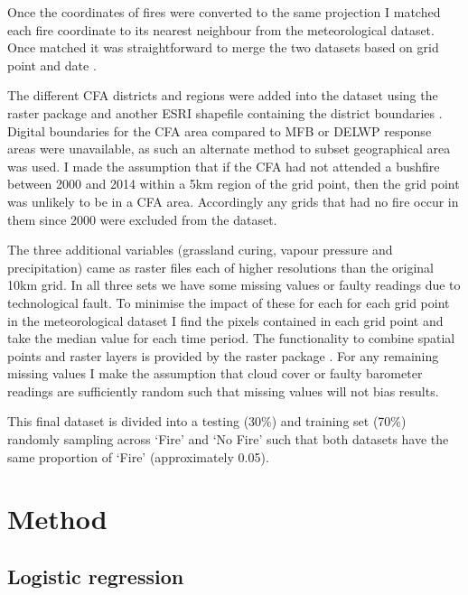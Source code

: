 \documentclass[11pt,a4paper]{article}
\begin{document}
Once the coordinates of fires were converted to the same projection I matched each fire coordinate to its nearest neighbour from the meteorological dataset. Once matched it was straightforward to merge the two datasets based on grid point and date \citep{datatable}.

The different CFA districts and regions were added into the dataset using the raster package and another ESRI shapefile containing the district boundaries \citep{raster}.
Digital boundaries for the CFA area compared to MFB or DELWP response areas were unavailable, as such an alternate method to subset geographical area was used. I made the assumption that if the CFA had not attended a bushfire between 2000 and 2014 within a 5km region of the grid point, then the grid point was unlikely to be in a CFA area. Accordingly any grids that had no fire occur in them since 2000 were excluded from the dataset.

The three additional variables (grassland curing, vapour pressure and precipitation) came as raster files each of higher resolutions than the original 10km grid. In all three sets we have some missing values or faulty readings due to technological fault. To minimise the impact of these for each for each grid point in the meteorological dataset I find the pixels contained in each grid point and take the median value for each time period. The functionality to combine spatial points and raster layers is provided by the raster package \citep{raster}. For any remaining missing values I make the assumption that cloud cover or faulty barometer readings are sufficiently random such that missing values will not bias results.


This final dataset is divided into a testing (30\%) and training set (70\%) randomly sampling across `Fire' and `No Fire' such that both datasets have the same proportion of `Fire' (approximately 0.05).

\section{Method}

\subsection{Logistic regression}
\end{document}
